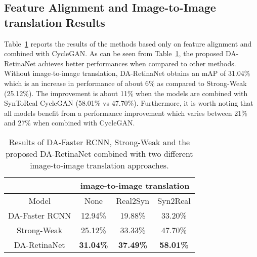 \documentclass[preprint]{elsarticle}
\begin{document}
\subsection{Feature Alignment and Image-to-Image translation Results}
Table~\ref{tab:feature_Align} reports the results of the methods based only on feature alignment and combined with CycleGAN. As can be seen from Table~\ref{tab:feature_Align}, the proposed DA-RetinaNet achieves better performances when compared to other methods. Without image-to-image translation, DA-RetinaNet obtains an mAP of 31.04\% which is an increase in performance of about 6\% as compared to Strong-Weak (25.12\%). The improvement is about 11\% when the models are combined with SynToReal CycleGAN (58.01\% vs 47.70\%). Furthermore, it is worth noting that all models benefit from a performance improvement which varies between 21\% and 27\% when combined with CycleGAN.
\begin{table}[t!]
\caption{Results of DA-Faster RCNN, Strong-Weak and the proposed DA-RetinaNet combined  with two different image-to-image translation approaches.}
\label{tab:feature_Align}
\centering
\begin{tabular}{|c||c||c||c|}
\hline
& \multicolumn{3}{c|}{image-to-image translation} \\
\hline
Model & None & Real2Syn & Syn2Real\\
\hline
DA-Faster RCNN & 12.94\% & 19.88\% & 33.20\%\\
\hline
Strong-Weak & 25.12\% & 33.33\% & 47.70\%\\
\hline
DA-RetinaNet & \textbf{31.04\%} & \textbf{37.49\%} & \textbf{58.01\%}\\
\hline
\end{tabular}
\end{table}
\end{document}
